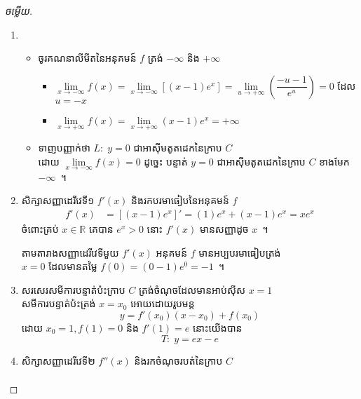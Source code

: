 \documentclass[a5paper,10pt,fleqn]{article}
\begin{document}
\begin{proof}[ចម្លើយ]
	\begin{enumerate}
		\item 
		\begin{itemize}
			\item ចូរគណនាលីមីតនៃអនុគមន៍ $ f $ ត្រង់ $ -\infty $ និង $ +\infty $
			\begin{itemize}
				\item $ \lim\limits_{x\to-\infty}f(x)=\lim\limits_{x\to-\infty}[(x-1)e^x]=\lim\limits_{u\to+\infty}\left(\dfrac{-u-1}{e^u}\right)=0 $ ដែល $ u=-x $
				\item $ \lim\limits_{x\to+\infty}f(x)=\lim\limits_{x\to+\infty}(x-1)e^x=+\infty $
			\end{itemize}
			\item ទាញបញ្ញាក់ថា	$ L:\; y=0 $ ជាអាស៊ីមតូតដេកនៃក្រាប $ C $\\
			ដោយ $ \lim\limits_{x\to-\infty}f(x)=0 $ ដូច្នេះ បន្ទាត់ $ y=0 $ ជាអាស៊ីមតូតដេកនៃក្រាប $ C $ ខាងមែក $ -\infty $~។
		\end{itemize}
		\item សិក្សាសញ្ញាដេរីវេទី១ $ f'(x) $ និងរកបរមាធៀបនៃអនុគមន៍ $ f $
		\begin{align*}
			f'(x)
				&=[(x-1)e^x]'
				=(1)e^x+(x-1)e^x
				=xe^x
		\end{align*}
		ចំពោះគ្រប់ $ x\in\mathbb{R} $ គេបាន $ e^x>0 $ នោះ $ f'(x) $ មានសញ្ញាដូច $ x $~។
		\begin{table}[H]
			\centering
		\end{table}
		តាមតារាងសញ្ញាដេរីវេទីមួយ $ f'(x) $ អនុគមន៍ $ f $ មានអប្បបរមាធៀបត្រង់\\
		$ x=0 $ ដែលមានតម្លៃ $ f(0)=(0-1)e^0=-1 $~។
		\item សរសេរសមីការបន្ទាត់ប៉ះក្រាប $ C $ ត្រង់ចំណុចដែលមានអាប់ស៊ីស $ x=1 $\\
		សមីការបន្ទាត់ប៉ះត្រង់ $ x=x_0 $ អោយដោយរូបមន្ត
		\begin{equation*}
			y=f'(x_0)(x-x_0)+f(x_0)
		\end{equation*}
		ដោយ $ x_0=1,f(1)=0 $ និង $ f'(1)=e $ នោះយើងបាន
		\begin{equation*}
			T:\;y=ex-e
		\end{equation*}
		\item សិក្សាសញ្ញាដេរីវេទី២ $ f''(x) $ និងរកចំណុចរបត់នៃក្រាប $ C $
		\begin{align*}

\end{align*}
\end{enumerate}
\end{proof}
\end{document}

